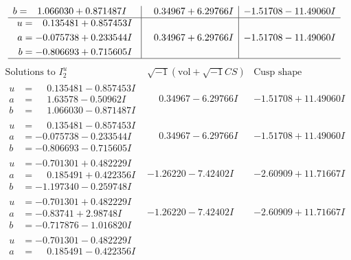 \documentclass[1p]{elsarticle_modified}
\theoremstyle{definition}
\newcommand{\I}{\sqrt{-1}}
\begin{document}
$$\begin{array}{c|c|c}
\begin{aligned}
b &= \phantom{-}1.066030 + 0.871487 I\end{aligned}
 & \phantom{-}0.34967 + 6.29766 I & -1.51708 - 11.49060 I \\ \hline\begin{aligned}
u &= \phantom{-}0.135481 + 0.857453 I \\
a &= -0.075738 + 0.233544 I \\
b &= -0.806693 + 0.715605 I\end{aligned}
 & \phantom{-}0.34967 + 6.29766 I & -1.51708 - 11.49060 I\\
 \hline 
 \end{array}$$\newpage$$\begin{array}{c|c|c}  
\text{Solutions to }I^u_{2}& \I (\text{vol} + \sqrt{-1}CS) & \text{Cusp shape}\\
 \hline 
\begin{aligned}
u &= \phantom{-}0.135481 - 0.857453 I \\
a &= \phantom{-}1.63578 - 0.50962 I \\
b &= \phantom{-}1.066030 - 0.871487 I\end{aligned}
 & \phantom{-}0.34967 - 6.29766 I & -1.51708 + 11.49060 I \\ \hline\begin{aligned}
u &= \phantom{-}0.135481 - 0.857453 I \\
a &= -0.075738 - 0.233544 I \\
b &= -0.806693 - 0.715605 I\end{aligned}
 & \phantom{-}0.34967 - 6.29766 I & -1.51708 + 11.49060 I \\ \hline\begin{aligned}
u &= -0.701301 + 0.482229 I \\
a &= \phantom{-}0.185491 + 0.422356 I \\
b &= -1.197340 - 0.259748 I\end{aligned}
 & -1.26220 - 7.42402 I & -2.60909 + 11.71667 I \\ \hline\begin{aligned}
u &= -0.701301 + 0.482229 I \\
a &= -0.83741 + 2.98748 I \\
b &= -0.717876 - 1.016820 I\end{aligned}
 & -1.26220 - 7.42402 I & -2.60909 + 11.71667 I \\ \hline\begin{aligned}
u &= -0.701301 - 0.482229 I \\
a &= \phantom{-}0.185491 - 0.422356 I \\

\end{aligned}
\end{array}$$
\end{document}
